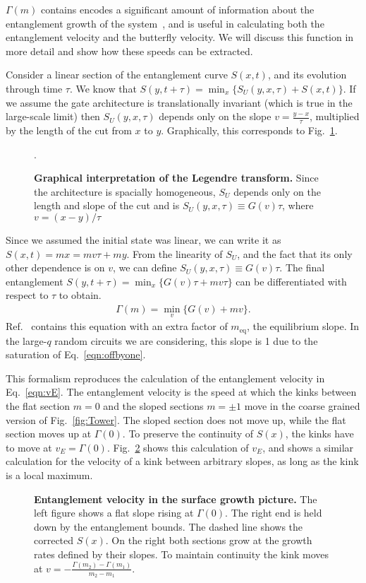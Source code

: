 $\Gamma(m)$ contains encodes a significant amount of information about the entanglement growth of the system~\cite{Jonay18}, and is useful in calculating both the entanglement velocity and the butterfly velocity. We will discuss this function in more detail and show how these speeds can be extracted.

Consider a linear section of the entanglement curve $S(x,t)$, and its evolution through time $\tau$. We know that $S(y,t+\tau) = \min_x\{S_U(y,x,\tau) + S(x,t)\}$. If we assume the gate architecture is translationally invariant (which is true in the large-scale limit) then $S_U(y,x,\tau)$ depends only on the slope $v = \frac{y-x}{\tau}$, multiplied by the length of the cut from $x$ to $y$. Graphically, this corresponds to Fig.~\ref{fig:legendre}.
\begin{figure}
	\centering
	
	\caption{\textbf{Graphical interpretation of the Legendre transform.} Since the architecture is spacially homogeneous, $S_U$ depends only on the length and slope of the cut and is $S_U(y,x,\tau) \equiv G(v)\tau$, where $v=(x-y)/\tau$}.
	\label{fig:legendre}
\end{figure}
Since we assumed the initial state was linear, we can write it as $S(x,t) = mx = mv\tau+my$. From the linearity of $S_U$, and the fact that its only other dependence is on $v$, we can define $S_U(y,x,\tau) \equiv G(v)\tau$. The final entanglement $S(y,t+\tau) = \min_x\{G(v)\tau + mv\tau\}$ can be differentiated with respect to $\tau$ to obtain.
\begin{align}
\Gamma(m) = \min_v\{G(v) + mv\}.
\end{align}
Ref.~\cite{Jonay18} contains this equation with an extra factor of $m_\text{eq}$, the equilibrium slope. In the large-$q$ random circuits we are considering, this slope is 1 due to the saturation of Eq.~\ref{eqn:offbyone}.

This formalism reproduces the calculation of the entanglement velocity in Eq.~\ref{eqn:vE}. The entanglement velocity is the speed at which the kinks between the flat section $m=0$ and the sloped sections $m=\pm1$ move in the coarse grained version of Fig.~\ref{fig:Tower}. The sloped section does not move up, while the flat section moves up at $\Gamma(0)$. To preserve the continuity of $S(x)$, the kinks have to move at $v_E=\Gamma(0)$. Fig.~\ref{fig:entanglevel} shows this calculation of $v_E$, and shows a similar calculation for the velocity of a kink between arbitrary slopes, as long as the kink is a local maximum.
\begin{figure}
	\centering
	
	\caption{\textbf{Entanglement velocity in the surface growth picture.} The left figure shows a flat slope rising at $\Gamma(0)$. The right end is held down by the entanglement bounds. The dashed line shows the corrected $S(x)$. On the right both sections grow at the growth rates defined by their slopes. To maintain continuity the kink moves at $v=-\frac{\Gamma(m_2)-\Gamma(m_1)}{m_2-m_1}$.}
	\label{fig:entanglevel}
\end{figure}

